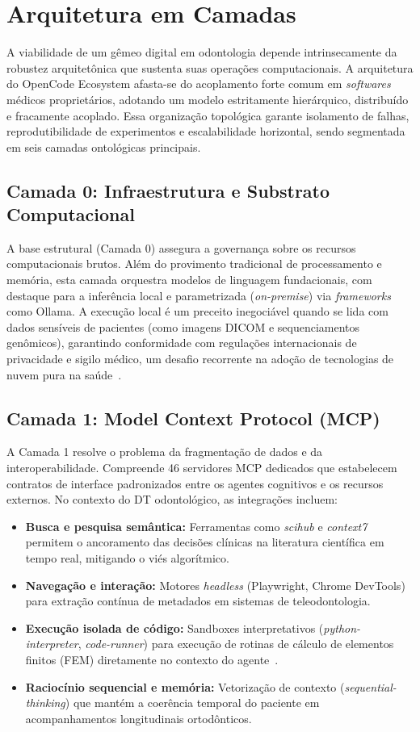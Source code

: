 \section{Arquitetura em Camadas}

A viabilidade de um gêmeo digital em odontologia depende intrinsecamente da robustez arquitetônica que sustenta suas operações computacionais. A arquitetura do OpenCode Ecosystem afasta-se do acoplamento forte comum em \textit{softwares} médicos proprietários, adotando um modelo estritamente hierárquico, distribuído e fracamente acoplado. Essa organização topológica garante isolamento de falhas, reprodutibilidade de experimentos e escalabilidade horizontal, sendo segmentada em seis camadas ontológicas principais.

\subsection{Camada 0: Infraestrutura e Substrato Computacional}
A base estrutural (Camada 0) assegura a governança sobre os recursos computacionais brutos. Além do provimento tradicional de processamento e memória, esta camada orquestra modelos de linguagem fundacionais, com destaque para a inferência local e parametrizada (\textit{on-premise}) via \textit{frameworks} como Ollama. A execução local é um preceito inegociável quando se lida com dados sensíveis de pacientes (como imagens DICOM e sequenciamentos genômicos), garantindo conformidade com regulações internacionais de privacidade e sigilo médico, um desafio recorrente na adoção de tecnologias de nuvem pura na saúde~\cite{Menon2026}.

\subsection{Camada 1: Model Context Protocol (MCP)}
A Camada 1 resolve o problema da fragmentação de dados e da interoperabilidade. Compreende 46 servidores MCP dedicados que estabelecem contratos de interface padronizados entre os agentes cognitivos e os recursos externos. No contexto do DT odontológico, as integrações incluem:
\begin{itemize}
    \item \textbf{Busca e pesquisa semântica:} Ferramentas como \textit{scihub} e \textit{context7} permitem o ancoramento das decisões clínicas na literatura científica em tempo real, mitigando o viés algorítmico.
    \item \textbf{Navegação e interação:} Motores \textit{headless} (Playwright, Chrome DevTools) para extração contínua de metadados em sistemas de teleodontologia.
    \item \textbf{Execução isolada de código:} Sandboxes interpretativos (\textit{python-interpreter}, \textit{code-runner}) para execução de rotinas de cálculo de elementos finitos (FEM) diretamente no contexto do agente~\cite{Zhang2024}.
    \item \textbf{Raciocínio sequencial e memória:} Vetorização de contexto (\textit{sequential-thinking}) que mantém a coerência temporal do paciente em acompanhamentos longitudinais ortodônticos.
\end{itemize}


